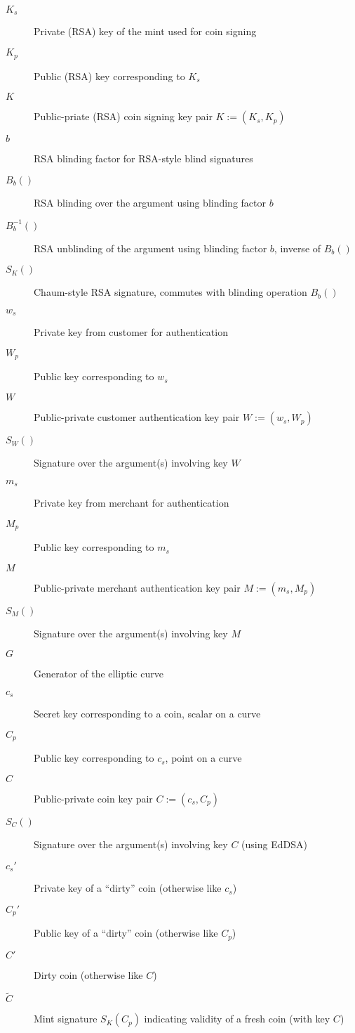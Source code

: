 \documentclass{llncs}
\begin{document}
\begin{description}
  \item[$K_s$]{Private (RSA) key of the mint used for coin signing}
  \item[$K_p$]{Public (RSA) key corresponding to $K_s$}
  \item[$K$]{Public-priate (RSA) coin signing key pair $K := (K_s, K_p)$}
  \item[$b$]{RSA blinding factor for RSA-style blind signatures}
  \item[$B_b()$]{RSA blinding over the argument using blinding factor $b$}
  \item[$B^{-1}_b()$]{RSA unblinding of the argument using blinding factor $b$, inverse of $B_b()$}
  \item[$S_K()$]{Chaum-style RSA signature, commutes with blinding operation $B_b()$}
  \item[$w_s$]{Private key from customer for authentication}
  \item[$W_p$]{Public key corresponding to $w_s$}
  \item[$W$]{Public-private customer authentication key pair $W := (w_s, W_p)$}
  \item[$S_W()$]{Signature over the argument(s) involving key $W$}
  \item[$m_s$]{Private key from merchant for authentication}
  \item[$M_p$]{Public key corresponding to $m_s$}
  \item[$M$]{Public-private merchant authentication key pair $M := (m_s, M_p)$}
  \item[$S_M()$]{Signature over the argument(s) involving key $M$}
  \item[$G$]{Generator of the elliptic curve}
  \item[$c_s$]{Secret key corresponding to a coin, scalar on a curve}
  \item[$C_p$]{Public key corresponding to $c_s$, point on a curve}
  \item[$C$]{Public-private coin key pair $C := (c_s, C_p)$}
  \item[$S_{C}()$]{Signature over the argument(s) involving key $C$ (using EdDSA)}
  \item[$c_s'$]{Private key of a ``dirty'' coin (otherwise like $c_s$)}
  \item[$C_p'$]{Public key of a ``dirty'' coin (otherwise like $C_p$)}
  \item[$C'$]{Dirty coin (otherwise like $C$)}
  \item[$\widetilde{C}$]{Mint signature $S_K(C_p)$ indicating validity of a fresh coin (with key $C$)}

\end{description}
\end{document}
